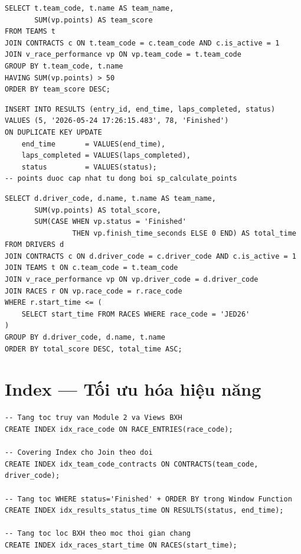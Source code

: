 \documentclass[13pt, a4paper]{report}
\begin{document}
\begin{lstlisting}[caption={SELECT với GROUP BY + HAVING --- Đội có điểm trên 50}]
SELECT t.team_code, t.name AS team_name,
       SUM(vp.points) AS team_score
FROM TEAMS t
JOIN CONTRACTS c ON t.team_code = c.team_code AND c.is_active = 1
JOIN v_race_performance vp ON vp.team_code = t.team_code
GROUP BY t.team_code, t.name
HAVING SUM(vp.points) > 50
ORDER BY team_score DESC;
\end{lstlisting}

\begin{lstlisting}[caption={INSERT với ON DUPLICATE KEY UPDATE --- Upsert kết quả}]
INSERT INTO RESULTS (entry_id, end_time, laps_completed, status)
VALUES (5, '2026-05-24 17:26:15.483', 78, 'Finished')
ON DUPLICATE KEY UPDATE
    end_time       = VALUES(end_time),
    laps_completed = VALUES(laps_completed),
    status         = VALUES(status);
-- points duoc cap nhat tu dong boi sp_calculate_points
\end{lstlisting}

\begin{lstlisting}[caption={SELECT với Subquery --- BXH đến một chặng cụ thể}]
SELECT d.driver_code, d.name, t.name AS team_name,
       SUM(vp.points) AS total_score,
       SUM(CASE WHEN vp.status = 'Finished' 
                THEN vp.finish_time_seconds ELSE 0 END) AS total_time
FROM DRIVERS d
JOIN CONTRACTS c ON d.driver_code = c.driver_code AND c.is_active = 1
JOIN TEAMS t ON c.team_code = t.team_code
JOIN v_race_performance vp ON vp.driver_code = d.driver_code
JOIN RACES r ON vp.race_code = r.race_code
WHERE r.start_time <= (
    SELECT start_time FROM RACES WHERE race_code = 'JED26'
)
GROUP BY d.driver_code, d.name, t.name
ORDER BY total_score DESC, total_time ASC;
\end{lstlisting}

\section{Index --- Tối ưu hóa hiệu năng}

\begin{lstlisting}[caption={Tạo 4 index bổ sung tối ưu hiệu năng}]
-- Tang toc truy van Module 2 va Views BXH
CREATE INDEX idx_race_code ON RACE_ENTRIES(race_code);

-- Covering Index cho Join theo doi
CREATE INDEX idx_team_code_contracts ON CONTRACTS(team_code, driver_code);

-- Tang toc WHERE status='Finished' + ORDER BY trong Window Function
CREATE INDEX idx_results_status_time ON RESULTS(status, end_time);

-- Tang toc loc BXH theo moc thoi gian chang
CREATE INDEX idx_races_start_time ON RACES(start_time);
\end{lstlisting}
\end{document}
